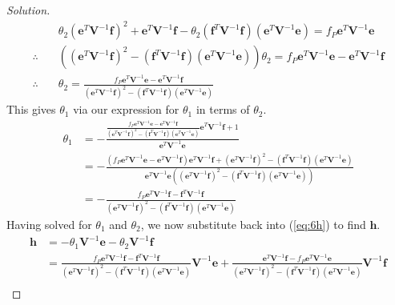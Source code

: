 \begin{proof}[Solution]
\begin{align*}
&\theta_{2}(\mathbf{e}^{T}\mathbf{V}^{-1}\mathbf{f})^{2} + \mathbf{e}^{T}\mathbf{V}^{-1}\mathbf{f} - \theta_{2}(\mathbf{f}^{T}\mathbf{V}^{-1}\mathbf{f})(\mathbf{e}^{T}\mathbf{V}^{-1}\mathbf{e}) = f_{P}\mathbf{e}^{T}\mathbf{V}^{-1}\mathbf{e} \\
\therefore \quad &((\mathbf{e}^{T}\mathbf{V}^{-1}\mathbf{f})^{2} - (\mathbf{f}^{T}\mathbf{V}^{-1}\mathbf{f})(\mathbf{e}^{T}\mathbf{V}^{-1}\mathbf{e}))\theta_{2} = f_{P}\mathbf{e}^{T}\mathbf{V}^{-1}\mathbf{e} - \mathbf{e}^{T}\mathbf{V}^{-1}\mathbf{f} \\
\therefore \quad &\theta_{2} = \frac{f_{P}\mathbf{e}^{T}\mathbf{V}^{-1}\mathbf{e} - \mathbf{e}^{T}\mathbf{V}^{-1}\mathbf{f}}{(\mathbf{e}^{T}\mathbf{V}^{-1}\mathbf{f})^{2} - (\mathbf{f}^{T}\mathbf{V}^{-1}\mathbf{f})(\mathbf{e}^{T}\mathbf{V}^{-1}\mathbf{e})}
\end{align*}
This gives $\theta_{1}$ via our expression for $\theta_{1}$ in terms of $\theta_{2}$.
\begin{align*}
\theta_{1} &= - \frac{\frac{f_{P}\mathbf{e}^{T}\mathbf{V}^{-1}\mathbf{e} - \mathbf{e}^{T}\mathbf{V}^{-1}\mathbf{f}}{(\mathbf{e}^{T}\mathbf{V}^{-1}\mathbf{f})^{2} - (\mathbf{f}^{T}\mathbf{V}^{-1}\mathbf{f})(\mathbf{e}^{T}\mathbf{V}^{-1}\mathbf{e})}\mathbf{e}^{T}\mathbf{V}^{-1}\mathbf{f} + 1}{\mathbf{e}^{T}\mathbf{V}^{-1}\mathbf{e}} \\
&= -\frac{(f_{P}\mathbf{e}^{T}\mathbf{V}^{-1}\mathbf{e} - \mathbf{e}^{T}\mathbf{V}^{-1}\mathbf{f})\mathbf{e}^{T}\mathbf{V}^{-1}\mathbf{f} + (\mathbf{e}^{T}\mathbf{V}^{-1}\mathbf{f})^{2} - (\mathbf{f}^{T}\mathbf{V}^{-1}\mathbf{f})(\mathbf{e}^{T}\mathbf{V}^{-1}\mathbf{e})}{\mathbf{e}^{T}\mathbf{V}^{-1}\mathbf{e}((\mathbf{e}^{T}\mathbf{V}^{-1}\mathbf{f})^{2} - (\mathbf{f}^{T}\mathbf{V}^{-1}\mathbf{f})(\mathbf{e}^{T}\mathbf{V}^{-1}\mathbf{e}))}\\
&= - \frac{f_{P}\mathbf{e}^{T}\mathbf{V}^{-1}\mathbf{f} - \mathbf{f}^{T}\mathbf{V}^{-1}\mathbf{f}}{(\mathbf{e}^{T}\mathbf{V}^{-1}\mathbf{f})^{2} - (\mathbf{f}^{T}\mathbf{V}^{-1}\mathbf{f})(\mathbf{e}^{T}\mathbf{V}^{-1}\mathbf{e})}
\end{align*}
Having solved for $\theta_{1}$ and $\theta_{2}$, we now substitute back into (\ref{eq:6h}) to find $\mathbf{h}$.
\begin{align*}
\mathbf{h} &= -\theta_{1}\mathbf{V}^{-1}\mathbf{e} - \theta_{2} \mathbf{V}^{-1}\mathbf{f}\\
&= \frac{f_{P}\mathbf{e}^{T}\mathbf{V}^{-1}\mathbf{f} - \mathbf{f}^{T}\mathbf{V}^{-1}\mathbf{f}}{(\mathbf{e}^{T}\mathbf{V}^{-1}\mathbf{f})^{2} - (\mathbf{f}^{T}\mathbf{V}^{-1}\mathbf{f})(\mathbf{e}^{T}\mathbf{V}^{-1}\mathbf{e})}\mathbf{V}^{-1}\mathbf{e} + \frac{\mathbf{e}^{T}\mathbf{V}^{-1}\mathbf{f} - f_{P}\mathbf{e}^{T}\mathbf{V}^{-1}\mathbf{e}}{(\mathbf{e}^{T}\mathbf{V}^{-1}\mathbf{f})^{2} - (\mathbf{f}^{T}\mathbf{V}^{-1}\mathbf{f})(\mathbf{e}^{T}\mathbf{V}^{-1}\mathbf{e})}\mathbf{V}^{-1}\mathbf{f}\\

\end{align*}
\end{proof}
